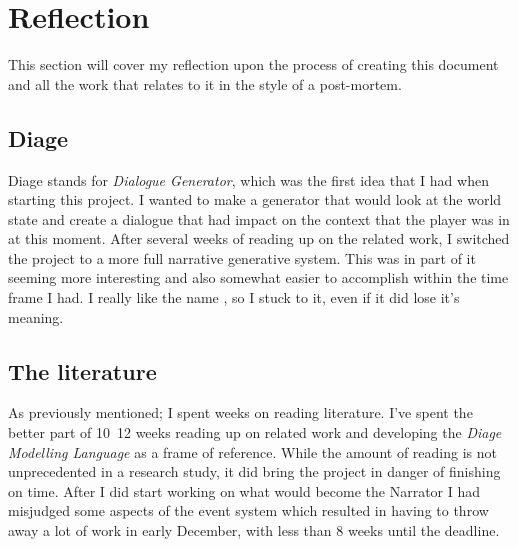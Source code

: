 \chapter{Reflection}
This section will cover my reflection upon the process of creating this document and all the work that relates to it in the style of a post-mortem.

\section{Diage}
Diage stands for \textit{Dialogue Generator}, which was the first idea that I had when starting this project. I wanted to make a generator that would look at the world state and create a dialogue that had impact on the context that the player was in at this moment. After several weeks of reading up on the related work, I switched the project to a more full narrative generative system. This was in part of it seeming more interesting and also somewhat easier to accomplish within the time frame I had. I really like the name \diage, so I stuck to it, even if it did lose it's meaning.

\section{The literature}
As previously mentioned; I spent weeks on reading literature. I've spent the better part of 10~12 weeks reading up on related work and developing the \textit{Diage Modelling Language} as a frame of reference. While the amount of reading is not unprecedented in a research study, it did bring the project in danger of finishing on time. After I did start working on what would become the Narrator I had misjudged some aspects of the event system which resulted in having to throw away a lot of work in early December, with less than 8 weeks until the deadline.